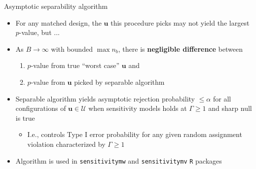 \documentclass[table, xcolor={dvipsnames}, 9pt]{beamer}
\theoremstyle{newstyle}
\begin{document}
\begin{frame}{Asymptotic separability algorithm}
\vfill
\begin{itemize} \vfill
\item For any matched design, the $\bm{u}$ this procedure picks may not yield the largest $p$-value, but ... \vfill
\item As $B \to \infty$ with bounded $\max n_b$, there is \textbf{negligible difference} between \vfill
\begin{enumerate}
\item $p$-value from true ``worst case'' $\bm{u}$ and \vfill
\item $p$-value from $\bm{u}$ picked by separable algorithm \vfill
\end{enumerate} \vfill
\item Separable algorithm yields asymptotic rejection probability $\leq \alpha$ for all configurations of $\bm{u} \in \mathcal{U}$ when sensitivity models holds at $\Gamma \geq 1$ and sharp null is true \vfill
\begin{itemize} \vfill
\item I.e., controls Type I error probability for any given random assignment violation characterized by $\Gamma \geq 1$ \vfill
\end{itemize} \vfill
\item Algorithm is used in \texttt{sensitivitymw} and \texttt{sensitivitymv} \texttt{R} packages \citep{rosenbaum2015} \vfill
\end{itemize} \vfill
\end{frame}
\end{document}
